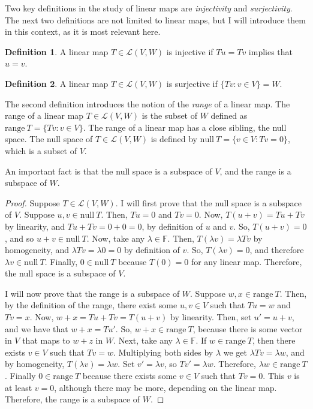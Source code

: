 \documentclass{article}
\renewcommand{\L}{\mathcal{L}}
\newcommand{\nulls}{\mathrm{null}}
\newcommand{\range}{\mathrm{range}\ }
\newcommand{\F}{\mathbb{F}}
\theoremstyle{definition}
\newtheorem{definition}{Definition}
\begin{document}
Two key definitions in the study of linear maps are \textit{injectivity} and \textit{surjectivity}. The next two definitions are not limited to linear maps, but I will introduce them in this context, as it is most relevant here. 
\begin{definition}
    A linear map $T \in \L(V, W)$ is injective if $Tu = Tv$ implies that $u = v$. 
\end{definition}
\begin{definition}
    A linear map $T \in \L(V, W)$ is surjective if $\{Tv : v \in V\} = W$. 
\end{definition}
The second definition introduces the notion of the \textit{range} of a linear map. The range of a linear map $T \in \L(V, W)$ is the subset of $W$ defined as $\range T = \{Tv : v \in V\}$. The range of a linear map has a close sibling, the null space. The null space of $T \in \L(V, W)$ is defined by $\nulls\ {T} = \{v \in V : Tv = 0\}$, which is a subset of $V$. 

An important fact is that the null space is a subspace of $V$, and the range is a subspace of $W$. 

\begin{proof}
    Suppose $T \in \L(V, W)$. I will first prove that the null space is a subspace of $V$. Suppose $u, v \in \nulls\ T$. Then, $Tu = 0$ and $Tv = 0$. Now, $T(u + v) = Tu + Tv$ by linearity, and $Tu + Tv = 0 + 0 = 0$, by definition of $u$ and $v$. So, $T(u + v) = 0$, and so $u + v \in \nulls\ T$. Now, take any $\lambda \in \F$. Then, $T(\lambda v) = \lambda Tv$ by homogeneity, and $\lambda Tv = \lambda 0 = 0$ by definition of $v$. So, $T(\lambda v) = 0$, and therefore $\lambda v \in \nulls\ T$. Finally, $0 \in \nulls\ T$ because $T(0) = 0$ for any linear map. Therefore, the null space is a subspace of $V$.

    I will now prove that the range is a subspace of $W$. Suppose $w, x \in \range T$. Then, by the definition of the range, there exist some $u, v \in V$ such that $Tu = w$ and $Tv = x$. Now, $w + x = Tu + Tv = T(u + v)$ by linearity. Then, set $u' = u + v$, and we have that $w + x = Tu'$. So, $w + x \in \range T$, because there is some vector in $V$ that maps to $w + z$ in $W$. Next, take any $\lambda \in \F$. If $w \in \range T$, then there exists $v \in V$ such that $Tv = w$. Multiplying both sides by $\lambda$ we get $\lambda Tv = \lambda w$, and by homogeneity, $T(\lambda v) = \lambda w$. Set $v' = \lambda v$, so $Tv' = \lambda w$. Therefore, $\lambda w \in \range T$. Finally $0 \in \range T$ because there exists some $v \in V$ such that $Tv = 0$. This $v$ is at least $v = 0$, although there may be more, depending on the linear map. Therefore, the range is a subspace of $W$. 
\end{proof}
\end{document}
